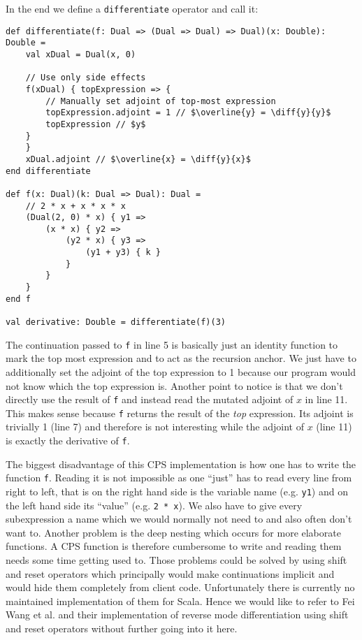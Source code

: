 In the end we define a \lstinline{differentiate} operator and call it:
\begin{lstlisting}[mathescape=true]
def differentiate(f: Dual => (Dual => Dual) => Dual)(x: Double): Double =
    val xDual = Dual(x, 0)

    // Use only side effects
    f(xDual) { topExpression => {
        // Manually set adjoint of top-most expression
        topExpression.adjoint = 1 // $\overline{y} = \diff{y}{y}$
        topExpression // $y$
    }
    }
    xDual.adjoint // $\overline{x} = \diff{y}{x}$
end differentiate

def f(x: Dual)(k: Dual => Dual): Dual =
    // 2 * x + x * x * x
    (Dual(2, 0) * x) { y1 =>
        (x * x) { y2 =>
            (y2 * x) { y3 =>
                (y1 + y3) { k }
            }
        }
    }
end f

val derivative: Double = differentiate(f)(3)
\end{lstlisting}
The continuation passed to \lstinline{f} in line 5 is basically just an identity function to mark the top most expression and to act as the recursion anchor. We just have to additionally set the adjoint of the top expression to 1 because our program would not know which the top expression is. Another point to notice is that we don't directly use the result of \lstinline{f} and instead read the mutated adjoint of $x$ in line 11. This makes sense because \lstinline{f} returns the result of the \emph{top} expression. Its adjoint is trivially 1 (line 7) and therefore is not interesting while the adjoint of $x$ (line 11) is exactly the derivative of \lstinline{f}.

The biggest disadvantage of this CPS implementation is how one has to write the function \lstinline{f}. Reading it is not impossible as one ``just'' has to read every line from right to left, that is on the right hand side is the variable name (e.g. \lstinline{y1}) and on the left hand side its ``value'' (e.g. \lstinline{2 * x}). We also have to give every subexpression a name which we would normally not need to and also often don't want to. Another problem is the deep nesting which occurs for more elaborate functions. A CPS function is therefore cumbersome to write and reading them needs some time getting used to. Those problems could be solved by using shift and reset operators which principally would make continuations implicit and would hide them completely from client code. Unfortunately there is currently no maintained implementation of them for Scala. Hence we would like to refer to Fei Wang et al. \cite{lantern} and their implementation of reverse mode differentiation using shift and reset operators without further going into it here. 
